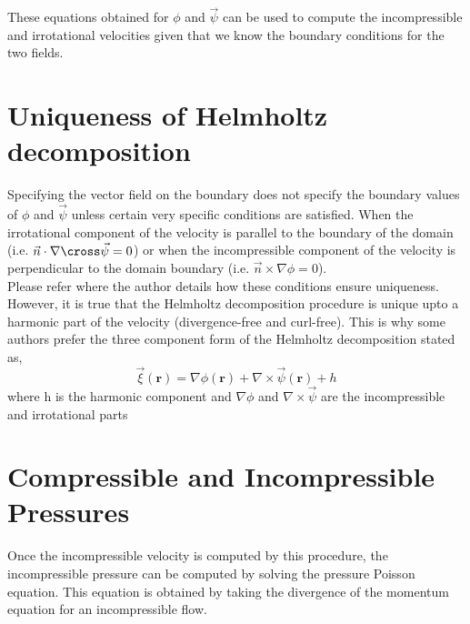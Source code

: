\documentclass[12pt, a4paper]{report}
\begin{document}
These equations obtained for $\phi$ and $\vec\psi$ can be used to compute the incompressible and irrotational velocities given that we know the boundary conditions for the two fields.\\

\section{Uniqueness of Helmholtz decomposition}
Specifying the vector field on the boundary does not specify the boundary values of $\phi$ and $\vec\psi$ unless certain very specific conditions are satisfied. 
When the irrotational component of the velocity is parallel to the boundary of the domain (i.e. $\vec{n} \cdot \nabla\cross\vec\psi = 0$) or when the incompressible component of the velocity is perpendicular to the domain boundary (i.e. $\vec{n} \times \nabla\phi = 0$).\\
Please refer \cite{harsh} where the author details how these conditions ensure uniqueness.
However, it is true that the Helmholtz decomposition procedure is unique upto a harmonic part of the velocity (divergence-free and curl-free). This is why some authors prefer the three component form of the Helmholtz decomposition stated as,
\begin{equation}
\vec\xi(\mathbf{r}) = \nabla \phi(\mathbf {r}) + \nabla \times \vec{\psi}(\mathbf {r}) + h
\end{equation}
where h is the harmonic component and $\nabla\phi$ and $\nabla\times\vec\psi$ are the incompressible and irrotational parts

\section{Compressible and Incompressible Pressures}

Once the incompressible velocity is computed by this procedure, the incompressible pressure can be computed by solving the pressure Poisson equation. This equation is obtained by taking the divergence of the momentum equation for an incompressible flow.
\end{document}
